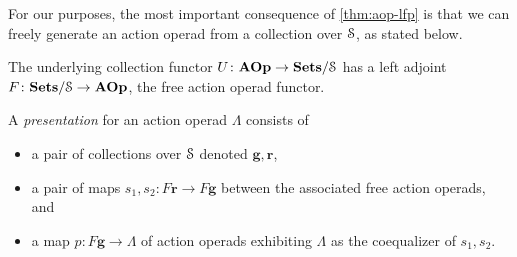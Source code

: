 %
%

For our purposes, the most important consequence of \cref{thm:aop-lfp} is that we can freely generate an action operad from a collection over $\mathcal{S}$, as stated below.

\begin{cor}\label{cor:free-aop-fun}
The underlying collection functor $U \colon \mathbf{AOp} \to  \mathbf{Sets}/\mathcal{S}$ has a left adjoint $F \colon \mathbf{Sets}/\mathcal{S} \rightarrow \mathbf{AOp}$, the free action operad functor.
\end{cor}

\begin{Defi}\label{Defi:pres-aop}
  A \textit{presentation} for an action operad $\Lambda$ consists of
  \begin{itemize}
    \item a pair of collections over $\mathcal{S}$ denoted $\mathbf{g}, \mathbf{r}$,
    \item a pair of maps $s_{1}, s_{2} \colon F\mathbf{r} \rightarrow F\mathbf{g}$ between the associated free action operads, and
    \item a map $p \colon F\mathbf{g} \rightarrow \Lambda$ of action operads exhibiting $\Lambda$ as the coequalizer of $s_{1},s_{2}$.
  \end{itemize}
\end{Defi}

